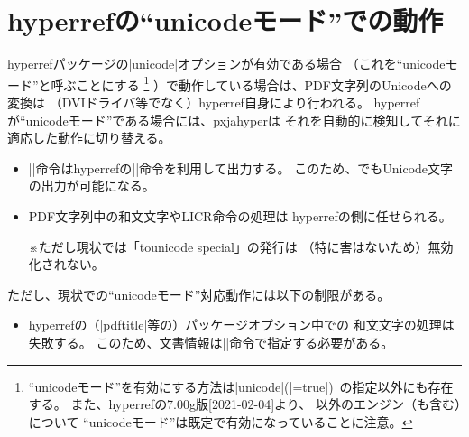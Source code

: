 \documentclass[uplatex,dvipdfmx,a4paper]{jsarticle}
\renewcommand{\headfont}{\gtfamily\romanseries{sbc}\sffamily}
\newcommand{\Pkg}[1]{\textsf{#1}}
\newcommand{\Note}{\par\noindent ※}
\newcommand{\／}{\mbox{}／\mbox{}}
\providecommand{\Strong}[1]{{\headfont#1}}
\begin{document}
\section{hyperrefの“unicodeモード”での動作}
\label{sec:Unicode-mode}

\Pkg{hyperref}パッケージの|unicode|オプションが有効である場合
（これを“unicodeモード”と呼ぶことにする
\footnote{“unicodeモード”を有効にする方法は|unicode|(|=true|)\,%
  の指定以外にも存在する。
  また、\Pkg{hyperref}の7.00g版[2021-02-04]より、
  {\pLaTeX}以外のエンジン（\Strong{{\upLaTeX}も含む}）について
  “unicodeモード”は既定で有効になっていることに注意。}%
）で動作している場合は、PDF文字列のUnicodeへの変換は
（DVIドライバ等でなく）\Pkg{hyperref}自身により行われる。
\Pkg{hyperref}が“unicodeモード”である場合には、\Pkg{pxjahyper}は
それを自動的に検知してそれに適応した動作に切り替える。
\begin{itemize}
\item |\Ux|命令は\Pkg{hyperref}の|\unichar|命令を利用して出力する。
  このため、{\pLaTeX}でもUnicode文字の出力が可能になる。
\item PDF文字列中の和文文字やLICR命令の処理は
  \Pkg{hyperref}の側に任せられる。
  \Note ただし現状では「tounicode special」の発行は
  （特に害はないため）無効化されない。
\end{itemize}
ただし、現状での“unicodeモード”対応動作には以下の制限がある。
\begin{itemize}
\item \Pkg{hyperref}の（|pdftitle|等の）パッケージオプション中での
  和文文字の処理は失敗する。
  このため、文書情報は|\hypersetup|命令で指定する必要がある。
\end{itemize}
\end{document}
